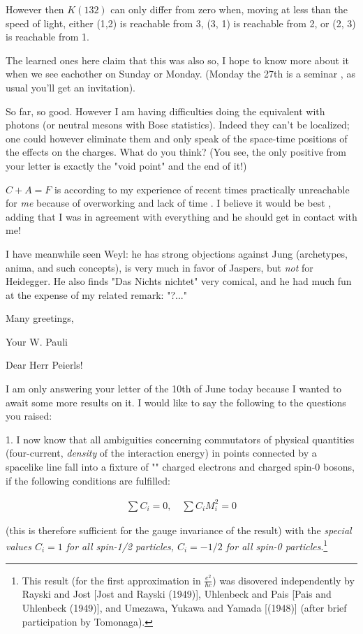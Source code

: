 \documentclass{article}
\newcommand{\uequ}[1]{
\begin{align*}
#1
\end{align*}
}
\begin{document}
However then $K(132)$ can only differ from zero when, moving at less than the speed of light, either (1,2) is reachable from 3, (3, 1) is reachable from 2, or (2, 3) is reachable from 1.

The learned ones here claim that this was also so, I hope to know more about it when we see eachother on Sunday or Monday. (Monday the 27th is a seminar , as usual you'll get an invitation). 

So far, so good. However I am having difficulties doing the equivalent with photons (or neutral mesons with Bose statistics). Indeed they can't be localized; one could however eliminate them and only speak of the space-time positions of the effects on the charges. What do you think? (You see, the only positive  from your letter is exactly the  "void point" and the end of it!)

$C+A=F$ is according to my experience of recent times practically unreachable for \textit{me} because of overworking and lack of time . I believe it would be best , adding that I was in agreement with everything and he should get in contact with me!

I have meanwhile seen Weyl: he has strong objections against Jung (archetypes, anima, and such concepts), is very much in favor of Jaspers, but \textit{not} for Heidegger. He also finds "Das Nichts nichtet" very comical, and he had much fun at the expense of my related remark: "?..."

Many greetings,

Your W. Pauli

\date{July 10, 1949}
\tags{}

Dear Herr Peierls!

I am only answering your letter of the 10th of June today because I wanted to await some more results on it. I would like to say the following to the questions you raised:

1. I now know that all ambiguities concerning commutators of physical quantities (four-current, \textit{density} of the interaction energy) in points connected by a spacelike line fall into a fixture of "" charged electrons and charged spin-0 bosons, if the following conditions are fulfilled:
\uequ{
\sum{C_i} = 0,\quad \sum{C_i M_i^2} = 0
}
(this is therefore sufficient for the gauge invariance of the result) with the \textit{special values $C_i=1$ for all spin-1/2 particles, $C_i=-1/2$ for all spin-0 particles}.\footnote{This result (for the first approximation in $\frac{e^2}{\hbar c}$) was disovered independently by Rayski and Jost [Jost and Rayski (1949)], Uhlenbeck and Pais [Pais and Uhlenbeck (1949)], and Umezawa, Yukawa and Yamada [(1948)] (after brief participation by Tomonaga).}
\end{document}
